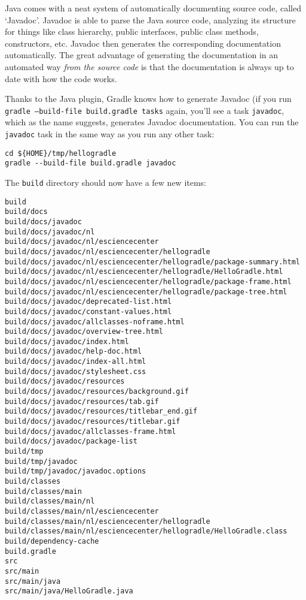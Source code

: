 Java comes with a neat system of automatically documenting source code, called `Javadoc'. Javadoc is able to parse the Java source code, analyzing its structure for things like class hierarchy, public interfaces, public class methods, constructors, etc. Javadoc then generates the corresponding documentation automatically. The great advantage of generating the documentation in an automated way \textit{from the source code} is that the documentation is always up to date with how the code works.

Thanks to the Java plugin, Gradle knows how to generate Javadoc (if you run \texttt{gradle --build-file build.gradle tasks} again, you'll see a task \texttt{javadoc}, which as the name suggests, generates Javadoc documentation. You can run the \texttt{javadoc} task in the same way as you run any other task:
\begin{lstlisting}[style=basic,style=bash]
cd ${HOME}/tmp/hellogradle
gradle --build-file build.gradle javadoc
\end{lstlisting} %

The \texttt{build} directory should now have a few new items:
\begin{lstlisting}[style=basic,style=bash]
build
build/docs
build/docs/javadoc
build/docs/javadoc/nl
build/docs/javadoc/nl/esciencecenter
build/docs/javadoc/nl/esciencecenter/hellogradle
build/docs/javadoc/nl/esciencecenter/hellogradle/package-summary.html
build/docs/javadoc/nl/esciencecenter/hellogradle/HelloGradle.html
build/docs/javadoc/nl/esciencecenter/hellogradle/package-frame.html
build/docs/javadoc/nl/esciencecenter/hellogradle/package-tree.html
build/docs/javadoc/deprecated-list.html
build/docs/javadoc/constant-values.html
build/docs/javadoc/allclasses-noframe.html
build/docs/javadoc/overview-tree.html
build/docs/javadoc/index.html
build/docs/javadoc/help-doc.html
build/docs/javadoc/index-all.html
build/docs/javadoc/stylesheet.css
build/docs/javadoc/resources
build/docs/javadoc/resources/background.gif
build/docs/javadoc/resources/tab.gif
build/docs/javadoc/resources/titlebar_end.gif
build/docs/javadoc/resources/titlebar.gif
build/docs/javadoc/allclasses-frame.html
build/docs/javadoc/package-list
build/tmp
build/tmp/javadoc
build/tmp/javadoc/javadoc.options
build/classes
build/classes/main
build/classes/main/nl
build/classes/main/nl/esciencecenter
build/classes/main/nl/esciencecenter/hellogradle
build/classes/main/nl/esciencecenter/hellogradle/HelloGradle.class
build/dependency-cache
build.gradle
src
src/main
src/main/java
src/main/java/HelloGradle.java
\end{lstlisting}

